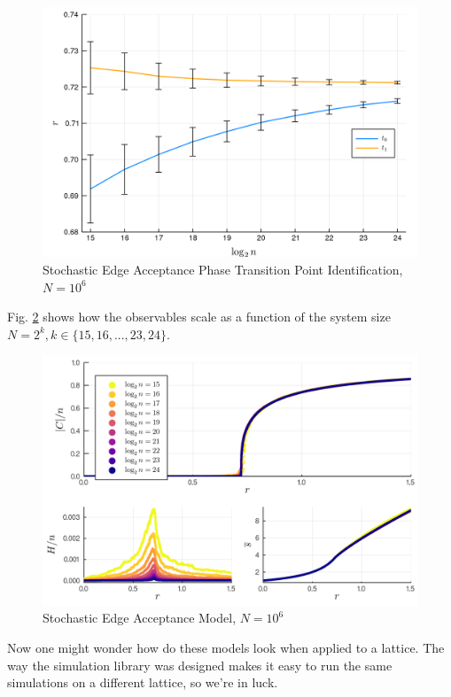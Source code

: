 \begin{figure}[H]
	\centering
	\includegraphics[width=350pt, clip]{images/delta_scaling_2.png}
	\caption{Stochastic Edge Acceptance Phase Transition Point Identification, $N = 10^6$}
	\label{fig:delta_scaling_2}
\end{figure}

Fig. \ref{fig:Network_stochastic_edge_acceptance_observables} shows how the observables scale as a function of the system size $N = 2^k, k \in \{15, 16, ..., 23, 24\}$.

\begin{figure}[H]
	\centering
	\includegraphics[width=350pt, clip]{images/Network_stochastic_edge_acceptance_observables.png}
	\caption{Stochastic Edge Acceptance Model, $N = 10^6$}
	\label{fig:Network_stochastic_edge_acceptance_observables}
\end{figure}

Now one might wonder how do these models look when applied to a lattice.
The way the simulation library was designed makes it easy to run the same simulations on a different lattice, so we're in luck.

